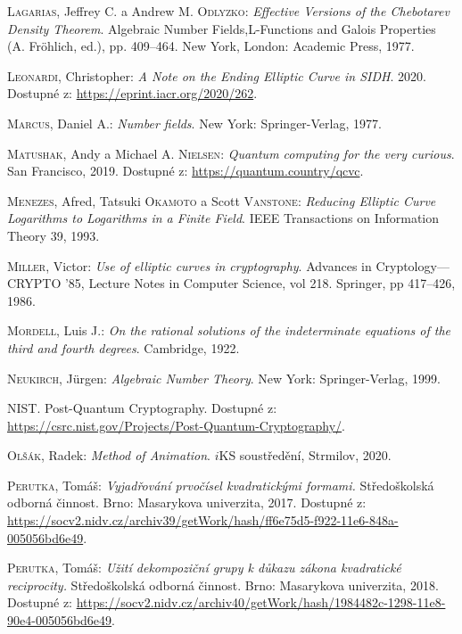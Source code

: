 \documentclass[12pt]{report}
\begin{document}
\begin{thebibliography}{97}
\textsc{Lagarias}, Jeffrey C. a Andrew M. \textsc{Odlyzko}: \textit{Effective Versions of the Chebotarev Density Theorem}. Algebraic Number Fields,L-Functions and Galois Properties (A. Fröhlich, ed.), pp. 409–464. New York, London: Academic Press, 1977.

\textsc{Leonardi}, Christopher: \textit{A Note on the Ending Elliptic Curve in SIDH}. 2020. Dostupné z: \url{https://eprint.iacr.org/2020/262}.

\textsc{Marcus}, Daniel A.: \textit{Number fields}. New York: Springer-Verlag, 1977.

\textsc{Matushak}, Andy a Michael A. \textsc{Nielsen}: \textit{Quantum computing for the very curious}. San Francisco, 2019. Dostupné z: \url{https://quantum.country/qcvc}.

\textsc{Menezes}, Afred, Tatsuki \textsc{Okamoto} a Scott \textsc{Vanstone}: \textit{Reducing Elliptic Curve Logarithms to Logarithms in a Finite Field}. IEEE Transactions on Information Theory 39, 1993.

\textsc{Miller}, Victor: \textit{Use of elliptic curves in cryptography}. Advances in Cryptology—CRYPTO ’85, Lecture Notes in Computer Science, vol 218. Springer, pp 417–426, 1986.

\textsc{Mordell}, Luis J.: \textit{On the rational solutions of the indeterminate equations of the third and fourth degrees}. Cambridge, 1922.

\textsc{Neukirch}, J{\"u}rgen: \textit{Algebraic Number Theory}. New York: Springer-Verlag, 1999.

\textsc{NIST}. Post-Quantum Cryptography. Dostupné z: \url{https://csrc.nist.gov/Projects/Post-Quantum-Cryptography/}.

\textsc{Olšák}, Radek: \textit{Method of Animation}. $i$KS soustředění, Strmilov, 2020.

\textsc{Perutka}, Tomáš: \textit{Vyjadřování prvočísel kvadratickými formami.} Středoškolská odborná činnost. Brno: Masarykova univerzita, 2017. Dostupné z: \url{https://socv2.nidv.cz/archiv39/getWork/hash/ff6e75d5-f922-11e6-848a-005056bd6e49}.

\textsc{Perutka}, Tomáš: \textit{Užití dekompoziční grupy k důkazu zákona kvadratické reciprocity.} Středoškolská odborná činnost. Brno: Masarykova univerzita, 2018. Dostupné z: \url{https://socv2.nidv.cz/archiv40/getWork/hash/1984482c-1298-11e8-90e4-005056bd6e49}.



\end{thebibliography}
\end{document}
